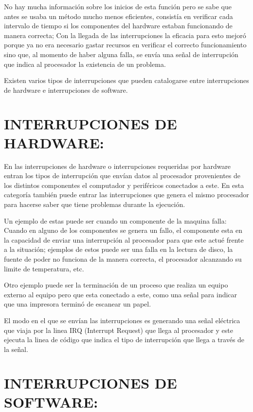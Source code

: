 \documentclass[12pt,letterpaper]{article}
\begin{document}
No hay mucha información sobre los inicios de esta función pero se sabe que antes se usaba un método mucho menos eficientes, consistía en verificar cada intervalo de tiempo si los componentes del hardware estaban funcionando de manera correcta; Con la llegada de las interrupciones la eficacia para esto mejoró porque ya no era necesario gastar recursos en verificar el correcto funcionamiento sino que, al momento de haber alguna falla, se envía una señal de interrupción que indica al procesador la existencia de un problema.

Existen varios tipos de interrupciones que pueden catalogarse entre interrupciones de hardware e interrupciones de software.


\section{INTERRUPCIONES DE HARDWARE:}

En las interrupciones de hardware o interrupciones requeridas por hardware entran los tipos de interrupción que envían datos al procesador provenientes de los distintos componentes el computador y periféricos conectados a este. En esta categoría también puede entrar las interrupciones que genera el mismo procesador para hacerse saber que tiene problemas durante la ejecución.

Un ejemplo de estas puede ser cuando un componente de la maquina falla: Cuando en alguno de los componentes se genera un fallo, el componente esta en la capacidad de enviar una interrupción al procesador para que este actué frente a la situación; ejemplos de estos puede ser una falla en la lectura de disco, la fuente de poder no funciona de la manera correcta, el procesador alcanzando su limite de temperatura, etc.

Otro ejemplo puede ser la terminación de un proceso que realiza un equipo externo al equipo pero que esta conectado a este, como una señal para indicar que una impresora terminó de escanear un papel.

El modo en el que se envían las interrupciones es generando una señal eléctrica que viaja por la linea IRQ (Interrupt Request) que llega al procesador y este ejecuta la linea de código que indica el tipo de interrupción que llega a través de la señal.


\section{INTERRUPCIONES DE SOFTWARE:}
\end{document}
